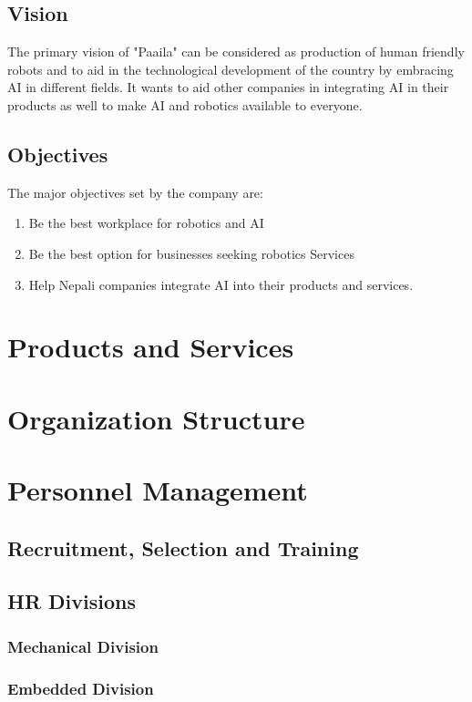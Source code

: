 \documentclass[12pt,a4paper]{scrreprt}
\begin{document}
\section{Vision}
The primary vision of "Paaila" can be considered as production of human friendly robots and to aid in the technological development of the country by embracing AI in different fields. It wants to aid other companies in integrating AI in their products as well to make AI and robotics available to everyone.

\section{Objectives}
The major objectives set by the company are:
\begin{enumerate}
  \item Be the best workplace for robotics and AI
  \item Be the best option for businesses seeking robotics Services
  \item Help Nepali companies integrate AI into their products and services.
\end{enumerate}

\chapter{Products and Services}


\chapter{Organization Structure}
\chapter{Personnel Management}
\section{Recruitment, Selection and Training}
\section{HR Divisions}
\subsection{Mechanical Division}
\subsection{Embedded Division}
\end{document}
